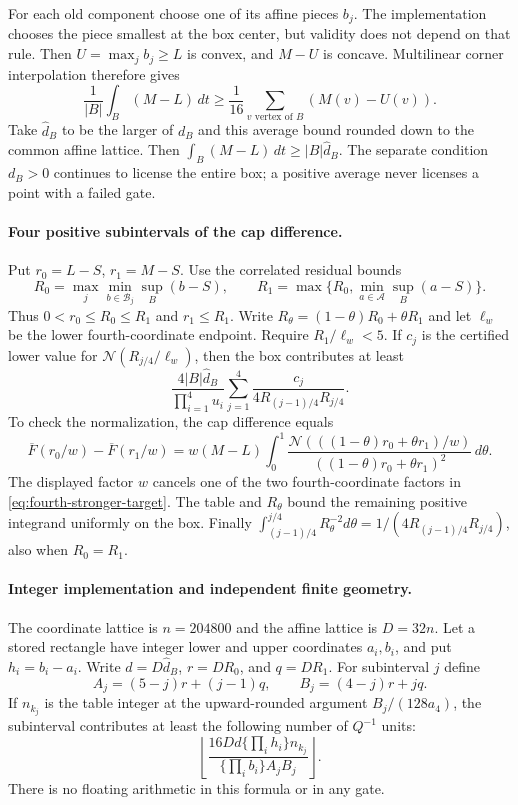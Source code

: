 \documentclass[11pt]{article}
\begin{document}
For each old component choose one of its affine pieces $b_j$.
The implementation chooses the piece smallest at the box center,
but validity does not depend on that rule.  Then
$U=\max_j b_j\ge L$ is convex, and $M-U$ is concave.  Multilinear
corner interpolation therefore gives
\[
 \frac1{|B|}\int_B(M-L)\,dt
 \ge\frac1{16}\sum_{v\text{ vertex of }B}(M(v)-U(v)).
\]
Take $\widehat d_B$ to be the larger of $d_B$ and this average
bound rounded down to the common affine lattice.  Then
$\int_B(M-L)\,dt\ge|B|\widehat d_B$.
The separate condition $d_B>0$ continues to license the entire box;
a positive average never licenses a point with a failed gate.

\paragraph{Four positive subintervals of the cap difference.}
Put $r_0=L-S$, $r_1=M-S$.  Use the correlated residual bounds
\[
 R_0=\max_j\min_{b\in\mathcal B_j}\sup_B(b-S),\qquad
 R_1=\max\{R_0,\min_{a\in\mathcal A}\sup_B(a-S)\}.
\]
Thus $0<r_0\le R_0\le R_1$ and $r_1\le R_1$.
Write $R_\theta=(1-\theta)R_0+\theta R_1$ and let
$\ell_w$ be the lower fourth-coordinate endpoint.  Require
$R_1/\ell_w<5$.  If $c_j$ is the certified lower value for
$\mathcal N(R_{j/4}/\ell_w)$, then the box contributes at least
\begin{equation}\label{eq:fourth-stronger-box}
 \frac{4|B|\widehat d_B}{\prod_{i=1}^4 u_i}
 \sum_{j=1}^4\frac{c_j}{4R_{(j-1)/4}R_{j/4}}.
\end{equation}
To check the normalization, the cap difference equals
\[
 \overline F(r_0/w)-\overline F(r_1/w)
 =w(M-L)\int_0^1
 \frac{\mathcal N(((1-\theta)r_0+\theta r_1)/w)}
 {((1-\theta)r_0+\theta r_1)^2}\,d\theta.
\]
The displayed factor $w$ cancels one of the two fourth-coordinate
factors in \eqref{eq:fourth-stronger-target}.
The table and $R_\theta$ bound the remaining positive integrand
uniformly on the box.  Finally
$\int_{(j-1)/4}^{j/4}R_\theta^{-2}d\theta
=1/(4R_{(j-1)/4}R_{j/4})$, also when $R_0=R_1$.

\paragraph{Integer implementation and independent finite geometry.}
The coordinate lattice is $n=204800$ and the affine lattice is
$D=32n$.  Let a stored rectangle have integer lower and upper
coordinates $a_i,b_i$, and put $h_i=b_i-a_i$.
Write $d=D\widehat d_B$, $r=D R_0$, and $q=D R_1$.
For subinterval $j$ define
\[
 A_j=(5-j)r+(j-1)q,\qquad B_j=(4-j)r+jq.
\]
If $n_{k_j}$ is the table integer at the upward-rounded argument
$B_j/(128a_4)$, the subinterval contributes at least the following
number of $Q^{-1}$ units:
\[
 \left\lfloor
 \frac{16D d\{\prod_i h_i\}n_{k_j}}
      {\{\prod_i b_i\}A_jB_j}
 \right\rfloor.
\]
There is no floating arithmetic in this formula or in any gate.
\end{document}
